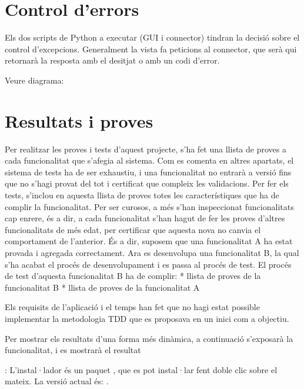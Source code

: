 \documentclass[letterpaper,11pt,catalan]{sphinxmanual}
\begin{document}
\section{Control d'errors}
\label{\detokenize{index:control-d-errors}}
Els dos scripts de Python a executar (GUI i connector) tindran la decisió sobre el control d'excepcions.
Generalment la vista fa peticions al connector, que serà qui retornarà la resposta amb el desitjat o amb un codi d'error.

Veure diagrama:



\section{Resultats i proves}
\label{\detokenize{index:resultats-i-proves}}
Per realitzar les proves i tests d'aquest projecte, s'ha fet una llista de proves a cada funcionalitat que s'afegia al sistema. Com es comenta en altres apartats, el sistema de tests ha de ser exhaustiu, i una funcionalitat no entrarà a versió fins que no s'hagi provat del tot i certificat que compleix les validacions. Per fer els tests, s'inclou en aquesta llista de proves totes les característiques que ha de complir la funcionalitat. Per ser curosos, a més s'han inspeccionat funcionalitats cap enrere, és a dir, a cada funcionalitat s'han hagut de fer les proves d'altres funcionalitats de més edat, per certificar que aquesta nova no canvia el comportament de l'anterior.
És a dir, suposem que una funcionalitat A ha estat provada i agregada correctament. Ara es desenvolupa una funcionalitat B, la qual s'ha acabat el procés de desenvolupament i es passa al procés de test. El procés de test d'aquesta funcionalitat B ha de complir:
* llista de proves de la funcionalitat B
* llista de proves de la funcionalitat A

Els requisits de l'aplicació i el temps han fet que no hagi estat possible implementar la metodologia TDD que es proposava en un inici com a objectiu.

Per mostrar els resultats d'una forma més dinàmica, a continuació s'exposarà la funcionalitat,
i es mostrarà el resultat

:
L'instal·lador és un paquet , que es pot instal·lar fent doble clic sobre el
mateix.
La versió actual és: .
\end{document}
